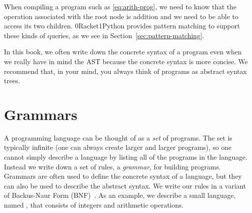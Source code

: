 \documentclass[7x10,nocrop]{TimesAPriori_MIT}%
\def\racketEd{0}
\def\pythonEd{1}
\def\edition{1}
\newcommand{\racket}[1]{{\if\edition\racketEd{#1}\fi}}
\newcommand{\python}[1]{{\if\edition\pythonEd #1\fi}}
\begin{document}
When compiling a program such as \eqref{eq:arith-prog}, we need to
know that the operation associated with the root node is addition and
we need to be able to access its two children. \racket{Racket}\python{Python}
provides pattern matching to support these kinds of queries, as we see in
Section~\ref{sec:pattern-matching}.

In this book, we often write down the concrete syntax of a program
even when we really have in mind the AST because the concrete syntax
is more concise.  We recommend that, in your mind, you always think of
programs as abstract syntax trees.

\section{Grammars}
\label{sec:grammar}

A programming language can be thought of as a \emph{set} of programs.
The set is typically infinite (one can always create larger and larger
programs), so one cannot simply describe a language by listing all of
the programs in the language. Instead we write down a set of rules, a
\emph{grammar}, for building programs. Grammars are often used to
define the concrete syntax of a language, but they can also be used to
describe the abstract syntax. We write our rules in a variant of
Backus-Naur Form (BNF)~\citep{Backus:1960aa,Knuth:1964aa}.
As an example, we describe a small language, named \LangInt{}, that consists of
integers and arithmetic operations.
\end{document}
